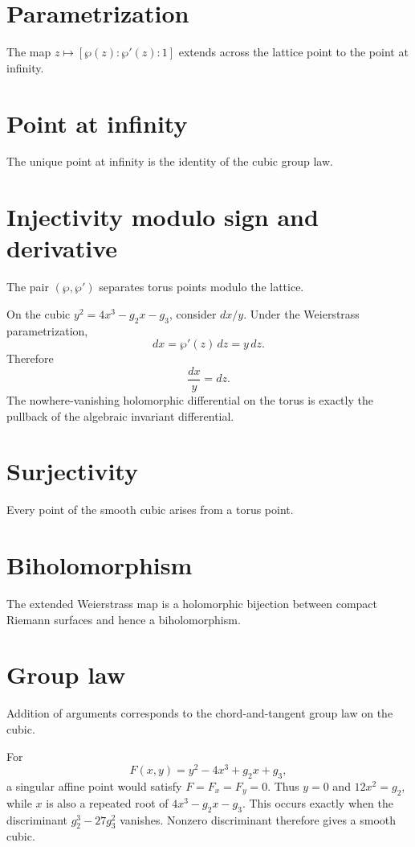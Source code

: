 \section{Parametrization}
The map $z\mapsto[\wp(z):\wp'(z):1]$ extends across the lattice point to the point at infinity.

\section{Point at infinity}
The unique point at infinity is the identity of the cubic group law.

\section{Injectivity modulo sign and derivative}
The pair $(\wp,\wp')$ separates torus points modulo the lattice.

\begin{example}\label{ex:iv31-expand-02}
On the cubic \(y^2=4x^3-g_2x-g_3\), consider \(dx/y\). Under the Weierstrass parametrization,
\[
dx=\wp'(z)\,dz=y\,dz.
\]
Therefore
\[
\frac{dx}{y}=dz.
\]
The nowhere-vanishing holomorphic differential on the torus is exactly the pullback of the algebraic invariant differential.
\end{example}
\section{Surjectivity}
Every point of the smooth cubic arises from a torus point.

\section{Biholomorphism}
The extended Weierstrass map is a holomorphic bijection between compact Riemann surfaces and hence a biholomorphism.

\section{Group law}
Addition of arguments corresponds to the chord-and-tangent group law on the cubic.

\begin{example}\label{ex:iv31-expand-03}
For
\[
F(x,y)=y^2-4x^3+g_2x+g_3,
\]
a singular affine point would satisfy \(F=F_x=F_y=0\). Thus \(y=0\) and \(12x^2=g_2\), while \(x\) is also a repeated root of \(4x^3-g_2x-g_3\). This occurs exactly when the discriminant \(g_2^3-27g_3^2\) vanishes. Nonzero discriminant therefore gives a smooth cubic.
\end{example}
